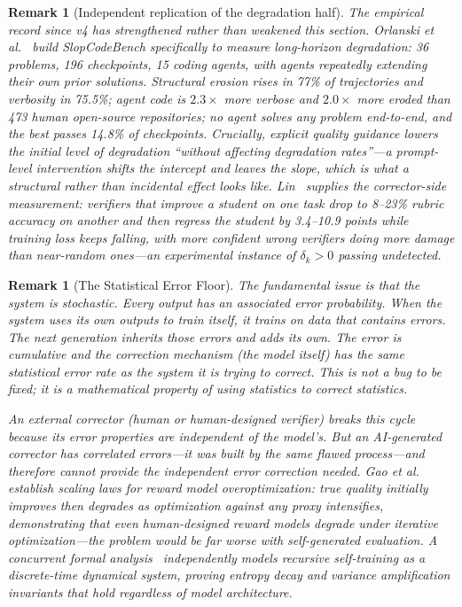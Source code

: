\documentclass[11pt,a4paper]{article}
\newtheorem{remark}[theorem]{Remark}
\begin{document}
\begin{remark}[Independent replication of the degradation half]
\label{rem:slop}
The empirical record since v4 has strengthened rather than weakened this section. Orlanski et al.~\cite{orlanski2026slop} build SlopCodeBench specifically to measure long-horizon degradation: 36 problems, 196 checkpoints, 15 coding agents, with agents repeatedly extending their own prior solutions. Structural erosion rises in 77\% of trajectories and verbosity in 75.5\%; agent code is $2.3\times$ more verbose and $2.0\times$ more eroded than 473 human open-source repositories; no agent solves any problem end-to-end, and the best passes 14.8\% of checkpoints. Crucially, explicit quality guidance lowers the \emph{initial} level of degradation ``without affecting degradation rates''---a prompt-level intervention shifts the intercept and leaves the slope, which is what a structural rather than incidental effect looks like. Lin~\cite{lin2026verifiers} supplies the corrector-side measurement: verifiers that improve a student on one task drop to 8--23\% rubric accuracy on another and then \emph{regress} the student by 3.4--10.9 points while training loss keeps falling, with more confident wrong verifiers doing more damage than near-random ones---an experimental instance of $\delta_k > 0$ passing undetected.
\end{remark}

\begin{remark}[The Statistical Error Floor]
The fundamental issue is that the system is stochastic. Every output has an associated error probability. When the system uses its own outputs to train itself, it trains on data that contains errors. The next generation inherits those errors and adds its own. The error is cumulative and the correction mechanism (the model itself) has the same statistical error rate as the system it is trying to correct. This is not a bug to be fixed; it is a mathematical property of using statistics to correct statistics.

An external corrector (human or human-designed verifier) breaks this cycle because its error properties are independent of the model's. But an AI-generated corrector has correlated errors---it was built by the same flawed process---and therefore cannot provide the independent error correction needed. Gao et al.~\cite{gao2022overoptimization} establish scaling laws for reward model overoptimization: true quality initially improves then degrades as optimization against any proxy intensifies, demonstrating that even human-designed reward models degrade under iterative optimization---the problem would be far worse with self-generated evaluation. A concurrent formal analysis~\cite{limitsself2025} independently models recursive self-training as a discrete-time dynamical system, proving entropy decay and variance amplification invariants that hold regardless of model architecture.
\end{remark}
\end{document}
